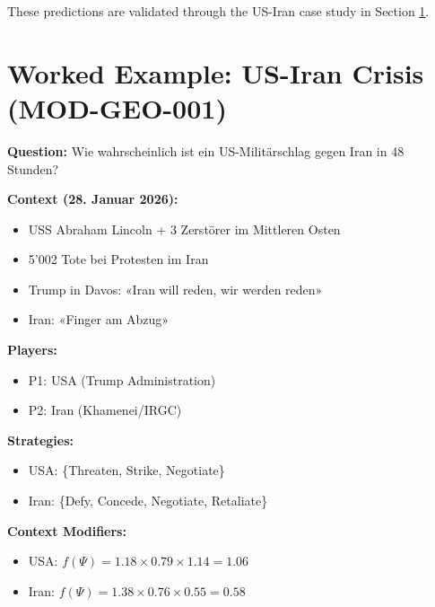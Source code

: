 These predictions are validated through the US-Iran case study in Section \ref{sec:crisis-example}.



\section{Worked Example: US-Iran Crisis (MOD-GEO-001)}
\label{sec:crisis-example}

\begin{tcolorbox}[colback=green!5!white, colframe=green!75!black,
    title=Worked Example: US-Iran January 2026]

\textbf{Question:} Wie wahrscheinlich ist ein US-Militärschlag gegen Iran in 48 Stunden?

\textbf{Context (28. Januar 2026):}
\begin{itemize}[nosep]
\item USS Abraham Lincoln + 3 Zerstörer im Mittleren Osten
\item 5'002 Tote bei Protesten im Iran
\item Trump in Davos: «Iran will reden, wir werden reden»
\item Iran: «Finger am Abzug»
\end{itemize}

\textbf{Players:}
\begin{itemize}[nosep]
\item P1: USA (Trump Administration)
\item P2: Iran (Khamenei/IRGC)
\end{itemize}

\textbf{Strategies:}
\begin{itemize}[nosep]
\item USA: \{Threaten, Strike, Negotiate\}
\item Iran: \{Defy, Concede, Negotiate, Retaliate\}
\end{itemize}

\textbf{Context Modifiers:}
\begin{itemize}[nosep]
\item USA: $f(\Psi) = 1.18 \times 0.79 \times 1.14 = 1.06$
\item Iran: $f(\Psi) = 1.38 \times 0.76 \times 0.55 = 0.58$
\end{itemize}


\end{tcolorbox}
